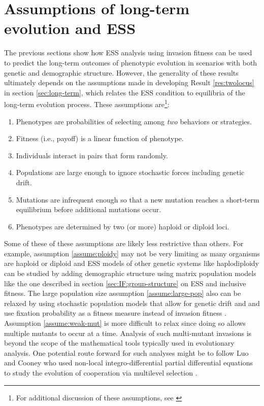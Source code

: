 \documentclass[11pt]{article}
\begin{document}
\section{Assumptions of long-term evolution and ESS}

The previous sections show how ESS analysis using invasion fitness can be used to predict the long-term outcomes of phenotypic evolution in scenarios with both genetic and demographic structure. However, the generality of these results ultimately depends on the assumptions made in developing Result \ref{res:twolocus} in section \ref{sec:long-term}, which relates the ESS condition to equilibria of the long-term evolution process. These assumptions are\footnote{For additional discussion of these assumptions, see \cite{Eshel:1996,Hammerstein:1996,Weissing:1996}}:
\begin{enumerate}[nosep]
  \item Phenotypes are probabilities of selecting among \textit{two} behaviors or strategies. \label{assume:twostrat}
  \item Fitness (i.e., payoff) is a linear function of phenotype. \label{assume:linear}
  \item Individuals interact in pairs that form randomly. \label{assume:pairwise}
  \item Populations are large enough to ignore stochastic forces including genetic drift. \label{assume:large-pop}
  \item Mutations are infrequent enough so that a new mutation reaches a short-term equilibrium before additional mutations occur. \label{assume:weak-mut}
  \item Phenotypes are determined by two (or more) haploid or diploid loci. \label{assume:ploidy}
\end{enumerate}
Some of these of these assumptions are likely less restrictive than others. For example, assumption \ref{assume:ploidy} may not be very limiting as many organisms are haploid or diploid and ESS models of other genetic systems like haplodiploidy can be studied by adding demographic structure using matrix population models \cite{Taylor:1990,Taylor:Frank:1996,Frank:1998} like the one described in section \ref{sec:IF:group-structure} on ESS and inclusive fitness. The large population size assumption \ref{assume:large-pop} also can be relaxed by using stochastic population models that allow for genetic drift and and use fixation probability as a fitness measure instead of invasion fitness \cite{Rousset:Billiard:2000,Rousset:2003,Nowak:Sasaki:2004,Lessard:2005,VanCleve:2015}. Assumption \ref{assume:weak-mut} is more difficult to relax since doing so allows multiple mutants to occur at a time. Analysis of such multi-mutant invasions is beyond the scope of the mathematical tools typically used in evolutionary analysis. One potential route forward for such analyses might be to follow Luo and Cooney who used non-local integro-differential partial differential equations to study the evolution of cooperation via multilevel selection \cite{Luo:2014,Luo:Mattingly:2017,Cooney:2019,Cooney:2020,Cooney:Mori:2022}.
\end{document}
